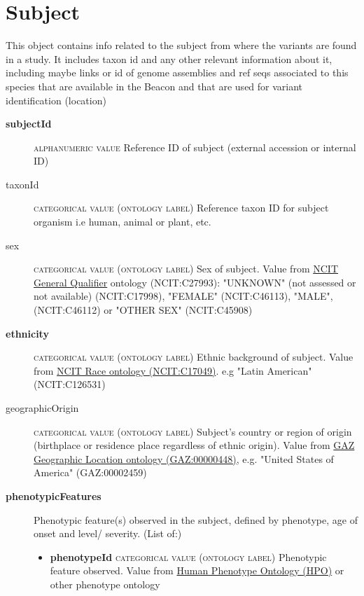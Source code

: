 \documentclass[a4paper, 10pt]{article}        %
\begin{document}
\section*{{\color{teal} Subject}}
This object contains info related to the subject from where the variants are found in a study. It includes taxon id and any other relevant information about it, including maybe links or id of genome assemblies and ref seqs associated to this species that are available in the Beacon and that are used for variant identification (location)
\begin{description}
	\item[\textbf{subjectId}]  {\textsc{alphanumeric value}} Reference ID of subject (external accession or internal ID)
	\item[taxonId] {\textsc{categorical value (ontology label)}} Reference taxon ID for subject organism i.e human, animal or plant, etc.
	\item[sex] {\textsc{categorical value (ontology label)}} Sex of subject. Value from \href{link}{NCIT General Qualifier} ontology (NCIT:C27993): "UNKNOWN" (not assessed or not available) (NCIT:C17998), "FEMALE" (NCIT:C46113), "MALE", (NCIT:C46112) or "OTHER SEX" (NCIT:C45908)
	\item[\textbf{ethnicity}] {\textsc{categorical value (ontology label)}} Ethnic background of subject. Value from \href{link}{NCIT Race ontology (NCIT:C17049)}. e.g "Latin American" (NCIT:C126531)
	\item[geographicOrigin] {\textsc{categorical value (ontology label)}} Subject's country or region of origin (birthplace or residence place regardless of ethnic origin). Value from \href{link}{GAZ Geographic Location ontology (GAZ:00000448)}, e.g. "United States of America" (GAZ:00002459)
	\item[\textbf{phenotypicFeatures}] Phenotypic feature(s) observed in the subject, defined by phenotype, age of onset and level/ severity. (List of:)
	\begin{itemize}
			\item[] \textbf{phenotypeId} {\textsc{categorical value (ontology label)}} Phenotypic feature observed. Value from \href{link}{Human Phenotype Ontology (HPO)} or other phenotype ontology

\end{itemize}
\end{description}
\end{document}
